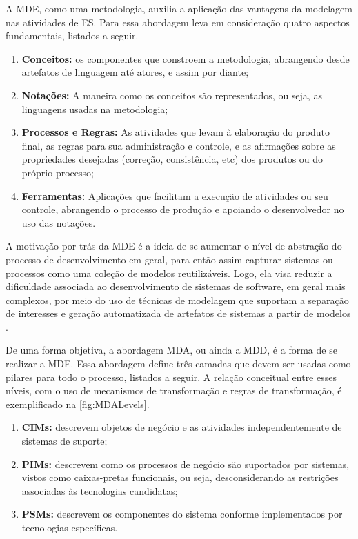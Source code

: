 A \ac{MDE}, como uma metodologia, auxilia a aplicação das vantagens da modelagem nas atividades de \ac{ES}. 
Para \cite{Brambilla:2017} essa abordagem leva em consideração quatro aspectos fundamentais, listados a seguir.

\begin{enumerate}
  \item \textbf{Conceitos:} os componentes que constroem a metodologia, abrangendo desde artefatos de linguagem até atores, e assim por diante;
  \item \textbf{Notações:} A maneira como os conceitos são representados, ou seja, as linguagens usadas na metodologia;
  \item \textbf{Processos e Regras:} As atividades que levam à elaboração do produto final, as regras para sua administração e controle, e as afirmações sobre as propriedades desejadas (correção, consistência, etc) dos produtos ou do próprio processo;
  \item \textbf{Ferramentas:} Aplicações que facilitam a execução de atividades ou seu controle, abrangendo o processo de produção e apoiando o desenvolvedor no uso das notações.
\end{enumerate}

A motivação por trás da \ac{MDE} é a ideia de se aumentar o nível de abstração do processo de desenvolvimento em geral, para então assim capturar sistemas ou processos como uma coleção de modelos reutilizáveis. 
Logo, ela visa reduzir a dificuldade associada ao desenvolvimento de sistemas de software, em geral mais complexos, por meio do uso de técnicas de modelagem que suportam a separação de interesses e geração automatizada de artefatos de sistemas a partir de modelos \cite{Kleppe:2003}.

De uma forma objetiva, a abordagem \ac{MDA}, ou ainda a \ac{MDD}, é a forma de se realizar a \ac{MDE}. 
Essa abordagem define três camadas que devem ser usadas como pilares para todo o processo, listados a seguir.
A relação conceitual entre esses níveis, com o uso de mecanismos de transformação e regras de transformação, é exemplificado na \autoref{fig:MDALevels}.

\begin{enumerate}
    \item \textbf{\acp{CIM}:} descrevem objetos de negócio e as atividades independentemente de sistemas de suporte;
    \item \textbf{\acp{PIM}:} descrevem como os processos de negócio são suportados por sistemas, vistos como caixas-pretas funcionais, ou seja, desconsiderando as restrições associadas às tecnologias candidatas;
    \item \textbf{\acp{PSM}:} descrevem os componentes do sistema conforme implementados por tecnologias específicas.
\end{enumerate}

